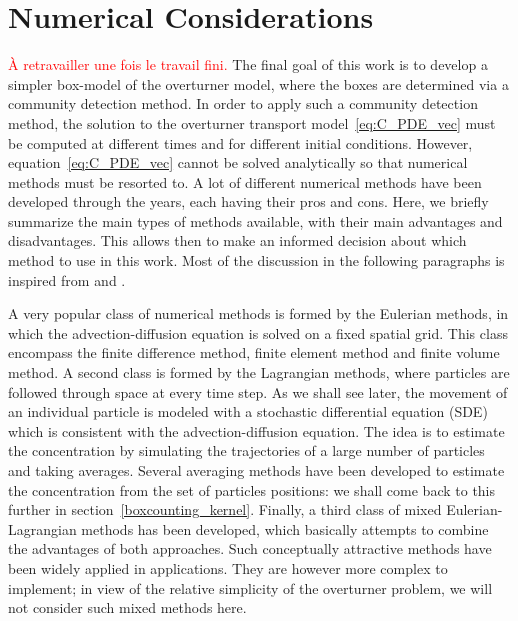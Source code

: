 \chapter{Numerical Considerations} \label{chap:numerical}
\textcolor{red}{À retravailler une fois le travail fini.}
The final goal of this work is to develop a simpler box-model of the overturner model, where the boxes are determined via a community detection method. In order to apply such a community detection method, the solution to the overturner transport model~\eqref{eq:C_PDE_vec} must be computed at different times and for different initial conditions. However, equation~\eqref{eq:C_PDE_vec} cannot be solved analytically so that numerical methods must be resorted to. A lot of different numerical methods have been developed through the years, each having their pros and cons. Here, we briefly summarize the main types of methods available, with their main advantages and disadvantages. This allows then to make an informed decision about which method to use in this work. Most of the discussion in the following paragraphs is inspired from \cite{spivakovskaya2007lagrangian} and \cite{spivakovskaya2007backward}. 

A very popular class of numerical methods is formed by the Eulerian methods, in which the advection-diffusion equation is solved on a fixed spatial grid. This class encompass the finite difference method, finite element method and finite volume method. A second class is formed by the Lagrangian methods, where particles are followed through space at every time step. As we shall see later, the movement of an individual particle is modeled with a stochastic differential equation (SDE) which is consistent with the advection-diffusion equation. The idea is to estimate the concentration by simulating the trajectories of a large number of particles and taking averages. Several averaging methods have been developed to estimate the concentration from the set of particles positions: we shall come back to this further in section~\ref{boxcounting_kernel}. Finally, a third class of mixed Eulerian-Lagrangian methods has been developed, which basically attempts to combine the advantages of both approaches. Such conceptually attractive methods have been widely applied in applications. They are however more complex to implement; in view of the relative simplicity of the overturner problem, we will not consider such mixed methods here.

